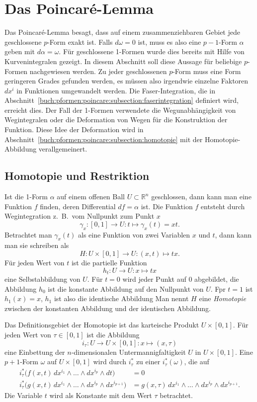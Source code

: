 %
%
\section{Das Poincaré-Lemma
\label{buch:pformen:section:poincarelemma}}
Das Poincaré-Lemma besagt, dass auf einem zusammenziehbaren Gebiet jede
geschlossene $p$-Form exakt ist.
Falls $d\omega=0$ ist, muss es also eine $p-1$-Form $\alpha$ geben mit
$d\alpha=\omega$.
Für geschlossene 1-Formen wurde dies bereits mit Hilfe von Kurvenintegralen
gezeigt.
In diesem Abschnitt soll diese Aussage für beliebige $p$-Formen
nachgewiesen werden.
Zu jeder geschlossenen $p$-Form muss eine Form geringeren Grades gefunden
werden, es müssen also irgendwie einzelne Faktoren $dx^i$ in Funktionen
umgewandelt werden.
Die Faser-Integration, die in
Abschnitt~\ref{buch:pformen:poincare:subsection:faserintegration}
definiert wird, erreicht dies.
Der Fall der 1-Formen verwendete die Wegunabhängigkeit von Wegintegralen
oder die Deformation von Wegen für die Konstruktion der Funktion.
Diese Idee der Deformation wird
in Abschnitt~\ref{buch:pformen:poincare:subsection:homotopie}
mit der Homotopie-Abbildung verallgemeinert.

%
%
\subsection{Homotopie und Restriktion}
%
Ist die 1-Form $\alpha$ auf einem offenen Ball $U\subset \mathbb{R}^n$
geschlossen, dann kann man eine Funktion $f$ finden, deren Differential
$df=\alpha$ ist.
Die Funktion $f$ entsteht durch Wegintegration z.~B.~vom Nullpunkt zum
Punkt $x$
\[
\gamma_x
\colon [0,1] \to U
:
t\mapsto \gamma_x(t) = xt.
\]
Betrachtet man $\gamma_x(t)$ als eine Funktion von zwei Variablen
$x$ und $t$, dann kann man sie schreiben als
\[
H
\colon
U\times[0,1]
\to
U
:
(x,t) \mapsto tx.
\]
Für jeden Wert von $t$ ist die partielle Funktion
\[
h_t \colon U \to U : x \mapsto tx
\]
eine Selbstabbildung von $U$.
Für $t=0$ wird jeder Punkt auf $0$ abgebildet, die Abbildung $h_0$ ist
die konstante Abbildung auf den Nullpunkt von $U$.
Fpr $t=1$ ist $h_1(x)=x$, $h_1$ ist also die identische Abbildung 
Man nennt $H$ eine {\em Homotopie} zwischen der konstanten Abbildung
und der identischen Abbildung.

Das Definitionsgebiet der Homotopie ist das karteische Produkt
$U\times[0,1]$.
Für jeden Wert von $\tau\in[0,1]$ ist die Abbildung
\[
i_\tau
\colon U \to U\times[0,1]
:
x\mapsto (x,\tau)
\]
eine Einbettung der $n$-dimensionalen Untermannigfaltigkeit $U$ in
$U\times[0,1]$.
Eine $p+1$-Form $\omega$ auf $U\times[0,1]$ wird durch $i_\tau^*$ zu
einer $i_\tau^*(\omega)$, die auf
\begin{align*}
i_\tau^*\bigl(
f(x,t)
\,dx^{i_1}\wedge \dots \wedge dx^{i_p}\wedge dt
\bigr)
&=
0
\\
i_\tau^*\bigl(
g(x,t)
\,dx^{i_1}\wedge \dots \wedge dx^{i_p}\wedge dx^{i_{p+1}}
\bigr)
&=
g(x,\tau)
\,dx^{i_1}\wedge \dots \wedge dx^{i_p}\wedge dx^{i_{p+1}}.
\end{align*}
Die Variable $t$ wird als Konstante mit dem Wert $\tau$ betrachtet.


